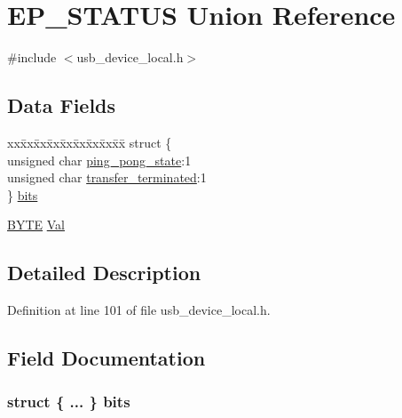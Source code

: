 \hypertarget{union_e_p___s_t_a_t_u_s}{}\section{E\+P\+\_\+\+S\+T\+A\+T\+U\+S Union Reference}
\label{union_e_p___s_t_a_t_u_s}


{\ttfamily \#include $<$usb\+\_\+device\+\_\+local.\+h$>$}

\subsection*{Data Fields}
\begin{DoxyCompactItemize}
\item 
\begin{tabbing}
xx\=xx\=xx\=xx\=xx\=xx\=xx\=xx\=xx\=\kill
struct \{\\
\>unsigned char \hyperlink{union_e_p___s_t_a_t_u_s_af0b1bd7b5767b174b8f055d94cac4bcc}{ping\_pong\_state}:1\\
\>unsigned char \hyperlink{union_e_p___s_t_a_t_u_s_a4a20792b6382277d34763fd0157c9f2e}{transfer\_terminated}:1\\
\} \hyperlink{union_e_p___s_t_a_t_u_s_a202c0cde114fcaa7b20a8aa2f1443ac7}{bits}\\

\end{tabbing}\item 
\hyperlink{_generic_type_defs_8h_a4ae1dab0fb4b072a66584546209e7d58}{B\+Y\+T\+E} \hyperlink{union_e_p___s_t_a_t_u_s_a5ab8c2bf45b20b5f7aa3a4f083896cec}{Val}
\end{DoxyCompactItemize}


\subsection{Detailed Description}


Definition at line 101 of file usb\+\_\+device\+\_\+local.\+h.



\subsection{Field Documentation}
\hypertarget{union_e_p___s_t_a_t_u_s_a202c0cde114fcaa7b20a8aa2f1443ac7}{}
\subsubsection[{bits}]{\setlength{\rightskip}{0pt plus 5cm}struct \{ ... \}   bits}\label{union_e_p___s_t_a_t_u_s_a202c0cde114fcaa7b20a8aa2f1443ac7}
\hypertarget{union_e_p___s_t_a_t_u_s_af0b1bd7b5767b174b8f055d94cac4bcc}{}
